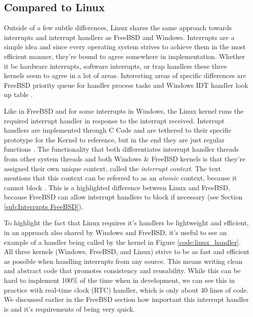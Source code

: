 \documentclass[10pt,draftclsnofoot,onecolumn]{IEEEtran}
\begin{document}
\subsection{Compared to Linux}
\label{sub:Interrupts Linux}
\par Outside of a few subtle differences, Linux shares the same approach towards interrupts and interrupt handlers as FreeBSD and Windows.
Interrupts are a simple idea and since every operating system strives to achieve them in the most efficient manner, they're bound to agree somewhere in implementation.
Whether it be hardware interrupts, software interrupts, or trap handlers these three kernels seem to agree in a lot of areas.
Interesting areas of specific differences are FreeBSD priority queue for handler process tasks and Windows IDT handler look up table \cite{bsd:1} \cite{win:1}.

\par Like in FreeBSD and for some interrupts in Windows, the Linux kernel runs the required interrupt handler in response to the interrupt received.
Interrupt handlers are implemented through C Code and are tethered to their specific prototype for the Kernel to reference, but in the end they are just regular functions \cite{linux:1}.
The functionality that both differentiates interrupt handler threads from other system threads and both Windows \& FreeBSD kernels is that they're assigned their own unique context, called the \textit{interrupt context}.
The text mentions that this context can be referred to as an \textit{atomic} context, because it cannot block \cite{linux:1}.
This is a highlighted difference between Linux and FreeBSD, because FreeBSD can allow interrupt handlers to block if necessary (see Section \ref{sub:Interrupts FreeBSD}).

\par To highlight the fact that Linux requires it's handlers be lightweight and efficient, in an approach also shared by Windows and FreeBSD, it's useful to see an example of a handler being called by the kernel in Figure \ref{code:linux_handler}.
All three kernels (Windows, FreeBSD, and Linux) strive to be as fast and efficient as possible when handling interrupts from any source.
This means writing clean and abstract code that promotes consistency and reusability.
While this can be hard to implement 100\% of the time when in development, we can see this in practice with real-time clock (RTC) handler, which is only about 40 lines of code.
We discussed earlier in the FreeBSD section how important this interrupt handler is and it's requirements of being very quick.
\end{document}
